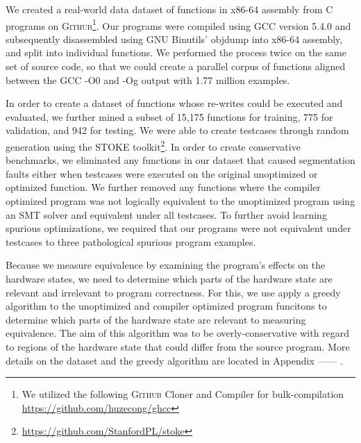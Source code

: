 \documentclass{article}
\newcommand{\GH}{\textsc{Github}}
\begin{document}


We created a real-world data dataset of functions in x86-64 assembly from C programs on \GH \footnote{We utilized the following \GH{}  Cloner and Compiler for bulk-compilation \url{https://github.com/huzecong/ghcc}}. Our programs were compiled using GCC version 5.4.0 and subsequently disassembled using \textsc{GNU} Binutils’ objdump into x86-64 assembly, and split into individual functions. We performed the process twice on the same set of source code, so that we could create a parallel corpus of functions aligned between the GCC -O0 and -Og output with 1.77 million examples. 

In order to create a dataset of functions whose re-writes could be executed and evaluated, we further mined a subset of 15,175 functions for training, 775 for validation, and 942 for testing. We were able to create testcases through random generation using the \textsc{STOKE} toolkit\footnote{\url{https://github.com/StanfordPL/stoke}}.  In order to create conservative benchmarks, we eliminated any functions in our dataset that caused segmentation faults either when testcases were executed on the original unoptimized or optimized function. We further removed any functions where the compiler optimized program was not logically equivalent to the unoptimized program using an SMT solver and equivalent under all testcases. To further avoid learning spurious optimizations, we required that our programs were not equivalent under testcases to three pathological spurious program examples. 

Because we measure equivalence by examining the program's effects on the hardware states, we need to determine which parts of the hardware state are relevant and irrelevant to program correctness. For this, we use apply a greedy algorithm to the unoptimized and compiler optimized program funcitons to determine which parts of the hardware state are relevant to measuring equivalence. The aim of this algorithm was to be overly-conservative with regard to regions of the hardware state that could differ from the source program. More details on the dataset and the greedy algorithm are located in Appendix ------ .
\end{document}
